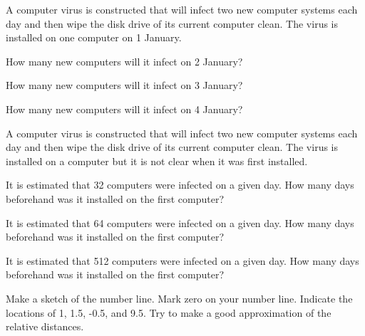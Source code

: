 
\begin{problem}
\item A computer virus is constructed that will infect two new
  computer systems each day and then wipe the disk drive of its
  current computer clean.  The virus is installed on one computer on
  1 January.
  \begin{subproblem}
  \item How many new computers will it infect on 2 January?
    \vfill
  \item How many new computers will it infect on 3 January?
    \vfill
  \item How many new computers will it infect on 4 January?
    \vfill
  \end{subproblem}
\item A computer virus is constructed that will infect two new
  computer systems each day and then wipe the disk drive of its
  current computer clean.  The virus is installed on a computer but it
  is not clear when it was first installed.
  \begin{subproblem}
  \item It is estimated that 32 computers were infected on a given
    day. How many days beforehand was it installed on the first computer?
    \vfill
  \item It is estimated that 64 computers were infected on a given
    day. How many days beforehand was it installed on the first computer?
    \vfill
  \item It is estimated that 512 computers were infected on a given
    day. How many days beforehand was it installed on the first computer?
    \vfill
  \end{subproblem}
\item Make a sketch of the number line. Mark zero on your number
  line. Indicate the locations of 1, 1.5, -0.5, and 9.5. Try to make a
  good approximation of the relative distances.
\end{problem}


